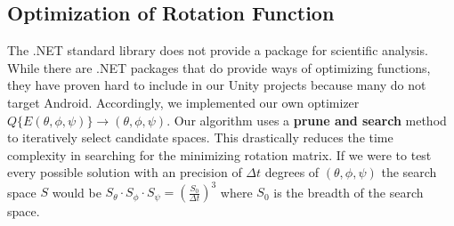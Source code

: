 \documentclass{article}
\begin{document}
\subsection*{Optimization of Rotation Function}
The .NET standard library does not provide a package for scientific analysis. While there are .NET packages that do provide ways of optimizing functions, they have proven hard to include in our Unity projects because many do not target Android. 
Accordingly, we implemented our own optimizer \(Q\{E(\theta, \phi, \psi)\} \to (\theta, \phi, \psi)\). Our algorithm uses a {\bf prune and search} method to iteratively select candidate spaces. This drastically reduces the time complexity in searching for the 
minimizing rotation matrix. If we were to test every possible solution with an precision of \(\Delta t\) degrees of \((\theta , \phi , \psi )\) the search space \(S\) would be \(S_\theta \cdot S_\phi \cdot S_\psi = \left( \frac{S_0}{\Delta t} \right)^3\) where \(S_0\) is the breadth of the search space.
\end{document}
